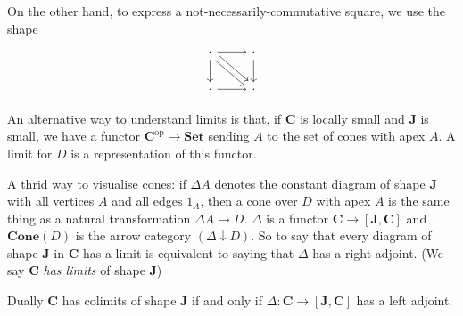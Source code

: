 \documentclass[a4paper]{article}
\renewcommand{\c}[1]{\mathbf{#1}}
\newcommand{\Set}{{\c{Set}}}
\newcommand{\Cone}{{\c{Cone}}}
\begin{document}
On the other hand, to express a not-necessarily-commutative square, we use the shape
\[
  \begin{tikzcd}
    \cdot \ar[r] \ar[d] \ar[dr, shift left] \ar[dr, shift right] & \cdot \ar[d] \\
    \cdot \ar[r] & \cdot
  \end{tikzcd}
\]

An alternative way to understand limits is that, if \(\c C\) is locally small and \(\c J\) is small, we have a functor \(\c C^{\text{op}} \to \Set\) sending \(A\) to the set of cones with apex \(A\). A limit for \(D\) is a representation of this functor.

A thrid way to visualise cones: if \(\Delta A\) denotes the constant diagram of shape \(\c J\) with all vertices \(A\) and all edges \(1_A\), then a cone over \(D\) with apex \(A\) is the same thing as a natural transformation \(\Delta A \to D\). \(\Delta\) is a functor \(\c C \to [\c J, \c C]\) and \(\Cone(D)\) is the arrow category \((\Delta \downarrow D)\). So to say that every diagram of shape \(\c J\) in \(\c C\) has a limit is equivalent to saying that \(\Delta\) has a right adjoint. (We say \(\c C\) \emph{has limits} of shape \(\c J\))

Dually \(\c C\) has colimits of shape \(\c J\) if and only if \(\Delta: \c C \to [\c J, \c C]\) has a left adjoint.
\end{document}
